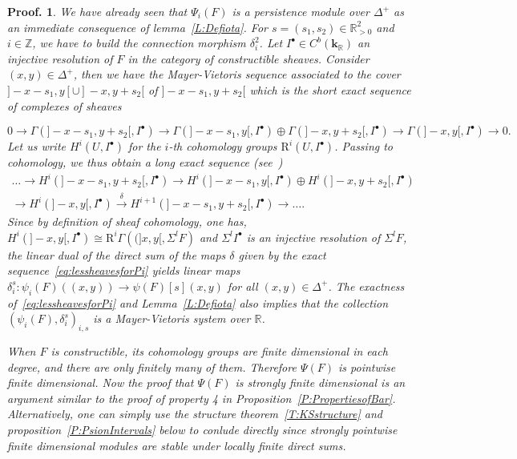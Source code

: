 \documentclass[a4paper, english, 11pt]{article}
\newcommand{\kk}[0]{\textbf{k}}
\newcommand{\0}{\vec{0}}
\newcommand{\R}[0]{\mathbb{R}}
\newcommand{\Z}[0]{\mathbb{Z}}
\newcommand{\Rr}[0]{\text{R}}
\newtheorem*{pf}{Proof.} }
\begin{document}
\begin{pf} We have already seen  that $\Psi_i(F)$ is a persistence module over $\Delta^+$ as an immediate consequence of lemma~\ref{L:Defiota}.
For $s = (s_1,s_2)\in \R^2_{>0}$ and $i\in\Z$, we have to build the connection morphism $\delta_i^2$. Let $I^\bullet\in C^b(\kk_\R)$ an injective resolution of $F$ in the category of constructible sheaves. Consider $(x,y)\in \Delta^+$, then we have the Mayer-Vietoris sequence associated to the cover $]-x - s_1 , y[ \cup ]-x , y + s_2[ $ of $]-x - s_1 , y + s_2[$ which is the short exact sequence of complexes of sheaves 

$$0 \longrightarrow \Gamma(]-x - s_1 , y + s_2[, I^\bullet) \longrightarrow \Gamma(]-x - s_1 , y[, I^\bullet) \oplus  \Gamma(]-x , y+s_2[, I^\bullet) \longrightarrow \Gamma(]-x,y[, I^\bullet) \longrightarrow 0 .$$
Let us write $H^i(U, I^\bullet)$ for the $i$-th cohomology groups $\Rr^i(U, I^\bullet)$. 
Passing to cohomology, we thus obtain a long exact sequence (see~\cite{Kash90}) 
\begin{multline}\label{eq:lessheavesforPi} 
\dots \to     H^i(]-x-s_1, y+s_2[, I^\bullet) \to 
 H^i(]-x-s_1, y[, I^\bullet) \oplus  H^i(]-x, y+s_2[, I^\bullet) \\ \to 
  H^i(]-x, y[, I^\bullet) \stackrel{\delta}\to H^{i+1}(]-x-s_1, y+s_2[, I^\bullet) \to \dots.
\end{multline}
Since by definition of sheaf cohomology, one has, $H^i(]-x, y[, I^\bullet) \cong \Rr^i\Gamma \left ( (]x,y[ , \Sigma^l F\right )$ and $\Sigma^l I^\bullet$ is an injective resolution of $\Sigma^l F$, the linear dual of the direct sum of the maps $\delta$ given by the exact sequence~\eqref{eq:lessheavesforPi} yields linear maps $\delta_i^s:\psi_i(F)((x,y)) \to \psi(F)[s](x,y)$ for all $(x,y) \in \Delta^+$. The exactness of~\eqref{eq:lessheavesforPi} and Lemma~\ref{L:Defiota} also implies that the collection $(\psi_i(F), \delta_i^s)_{i,s}$ is a Mayer-Vietoris system over $\R$.

\smallskip 

When $F$ is constructible, its cohomology groups are finite dimensional in each degree, and there are only finitely many of them. Therefore $\Psi(F)$ is pointwise finite dimensional. Now the proof that $\Psi(F)$ is strongly finite dimensional is an argument similar to the proof of property 4 in Proposition~\ref{P:PropertiesofBar}. Alternatively, one can simply use the structure theorem~\ref{T:KSstructure}
and proposition~\ref{P:PsionIntervals} below to conlude directly since  strongly pointwise finite dimensional modules are stable under locally finite direct sums.\end{pf}
\end{document}
